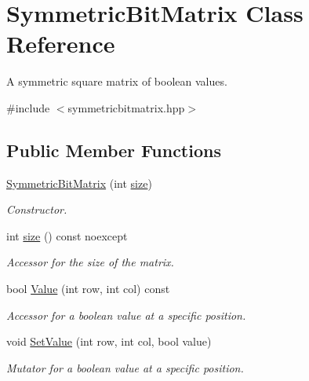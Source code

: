 \hypertarget{class_symmetric_bit_matrix}{}\section{Symmetric\+Bit\+Matrix Class Reference}
\label{class_symmetric_bit_matrix}


A symmetric square matrix of boolean values.  




{\ttfamily \#include $<$symmetricbitmatrix.\+hpp$>$}

\subsection*{Public Member Functions}
\begin{DoxyCompactItemize}
\item 
\hyperlink{class_symmetric_bit_matrix_a828dbcd597cd13390922d863357da3f3}{Symmetric\+Bit\+Matrix} (int \hyperlink{class_symmetric_bit_matrix_aed948744d70716f6325063ed55a76c6c}{size})
\begin{DoxyCompactList}\small\item\em Constructor. \end{DoxyCompactList}\item 
int \hyperlink{class_symmetric_bit_matrix_aed948744d70716f6325063ed55a76c6c}{size} () const noexcept
\begin{DoxyCompactList}\small\item\em Accessor for the size of the matrix. \end{DoxyCompactList}\item 
bool \hyperlink{class_symmetric_bit_matrix_a02221e8620c41734a56ec329da1b66c6}{Value} (int row, int col) const
\begin{DoxyCompactList}\small\item\em Accessor for a boolean value at a specific position. \end{DoxyCompactList}\item 
void \hyperlink{class_symmetric_bit_matrix_a5d97dfec2cf3910b2f46b80307528c43}{Set\+Value} (int row, int col, bool value)
\begin{DoxyCompactList}\small\item\em Mutator for a boolean value at a specific position. \end{DoxyCompactList}\item 
\mbox{\label{class_symmetric_bit_matrix_a826df2bf3b6c87438ecad72e83681816}} 

\end{DoxyCompactItemize}
